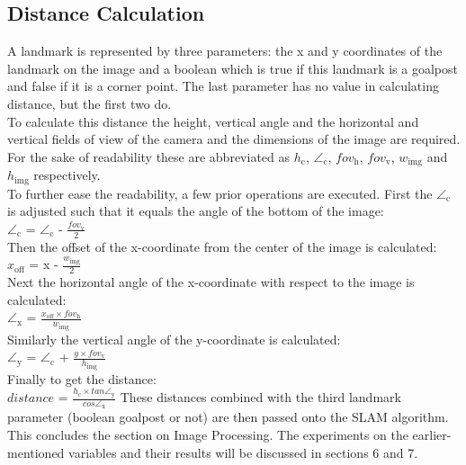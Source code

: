 \documentclass{ba-kecs}
\numberwithin{figure}{section}
\numberwithin{equation}{section}
\begin{document}
{\subsection{Distance Calculation}
A landmark is represented by three parameters: the x and y coordinates of the landmark on the image and a boolean which is true if this landmark is a goalpost and false if it is a corner point. The last parameter has no value in calculating distance, but the first two do.\\
To calculate this distance the height, vertical angle and the horizontal and vertical fields of view of the camera and the dimensions of the image are required. For the sake of readability these are abbreviated as $h_{\mathrm{c}}$, $\angle_{\mathrm{c}}$, $fov_{\mathrm{h}}$, $fov_{\mathrm{v}}$, $w_{\mathrm{img}}$ and $h_{\mathrm{img}}$ respectively. \\
To further ease the readability, a few prior operations are executed.
First the $\angle_{\mathrm{c}}$ is adjusted such that it equals the angle of the bottom of the image:\\
$\angle_{\mathrm{c}}$ = $\angle_{\mathrm{c}}$ - $\frac{fov_{\mathrm{v}}}{2}$ \\
Then the offset of the x-coordinate from the center of the image is calculated: \\
$x_{\mathrm{off}}$ = x - $\frac{w_{\mathrm{img}}}{2}$ \\
Next the horizontal angle of the x-coordinate with respect to the image is calculated: \\
$\angle_{\mathrm{x}}$ = $\frac{x_{\mathrm{off}} \times fov_{\mathrm{h}}}{w_{\mathrm{img}}}$ \\
Similarly the vertical angle of the y-coordinate is calculated: \\
$\angle_{\mathrm{y}}$ = $\angle_{\mathrm{c}}$ + $\frac{y \times fov_{\mathrm{v}}}{h_{\mathrm{img}}}$ \\
Finally to get the distance: \\
$\textit{distance}$ = $\frac{h_{\mathrm{c}} \times \textit{tan} \angle_{\mathrm{y}}}{\textit{cos} \angle_{\mathrm{x}}}$
These distances combined with the third landmark parameter (boolean goalpost or not) are then passed onto the SLAM algorithm. \\
This concludes the section on Image Processing. The experiments on the earlier-mentioned variables and their results will be discussed in sections 6 and 7. 


}
\end{document}
